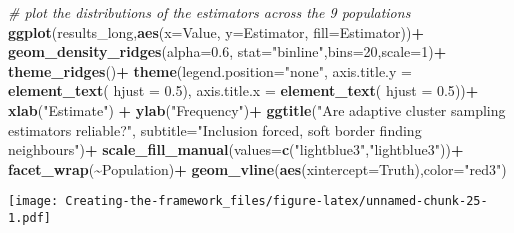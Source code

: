 \documentclass[
]{article}
\newenvironment{Shaded}{\begin{snugshade}}{\end{snugshade}}
\newcommand{\AttributeTok}[1]{\textcolor[rgb]{0.13,0.29,0.53}{#1}}
\newcommand{\CommentTok}[1]{\textcolor[rgb]{0.56,0.35,0.01}{\textit{#1}}}
\newcommand{\DecValTok}[1]{\textcolor[rgb]{0.00,0.00,0.81}{#1}}
\newcommand{\FloatTok}[1]{\textcolor[rgb]{0.00,0.00,0.81}{#1}}
\newcommand{\FunctionTok}[1]{\textcolor[rgb]{0.13,0.29,0.53}{\textbf{#1}}}
\newcommand{\NormalTok}[1]{#1}
\newcommand{\SpecialCharTok}[1]{\textcolor[rgb]{0.81,0.36,0.00}{\textbf{#1}}}
\newcommand{\StringTok}[1]{\textcolor[rgb]{0.31,0.60,0.02}{#1}}
\begin{document}
\begin{Shaded}
\begin{Highlighting}[]
\CommentTok{\# plot the distributions of the estimators across the 9 populations}
\FunctionTok{ggplot}\NormalTok{(results\_long,}\FunctionTok{aes}\NormalTok{(}\AttributeTok{x=}\NormalTok{Value, }\AttributeTok{y=}\NormalTok{Estimator, }\AttributeTok{fill=}\NormalTok{Estimator))}\SpecialCharTok{+}
  \FunctionTok{geom\_density\_ridges}\NormalTok{(}\AttributeTok{alpha=}\FloatTok{0.6}\NormalTok{, }\AttributeTok{stat=}\StringTok{"binline"}\NormalTok{,}\AttributeTok{bins=}\DecValTok{20}\NormalTok{,}\AttributeTok{scale=}\DecValTok{1}\NormalTok{)}\SpecialCharTok{+}
  \FunctionTok{theme\_ridges}\NormalTok{()}\SpecialCharTok{+}
  \FunctionTok{theme}\NormalTok{(}\AttributeTok{legend.position=}\StringTok{"none"}\NormalTok{,}
        \AttributeTok{axis.title.y =} \FunctionTok{element\_text}\NormalTok{( }\AttributeTok{hjust =} \FloatTok{0.5}\NormalTok{),}
        \AttributeTok{axis.title.x =} \FunctionTok{element\_text}\NormalTok{( }\AttributeTok{hjust =} \FloatTok{0.5}\NormalTok{))}\SpecialCharTok{+}
  \FunctionTok{xlab}\NormalTok{(}\StringTok{"Estimate"}\NormalTok{) }\SpecialCharTok{+}
  \FunctionTok{ylab}\NormalTok{(}\StringTok{"Frequency"}\NormalTok{)}\SpecialCharTok{+}
  \FunctionTok{ggtitle}\NormalTok{(}\StringTok{"Are adaptive cluster sampling estimators reliable?"}\NormalTok{,}
          \AttributeTok{subtitle=}\StringTok{"Inclusion forced, soft border finding neighbours"}\NormalTok{)}\SpecialCharTok{+}
  \FunctionTok{scale\_fill\_manual}\NormalTok{(}\AttributeTok{values=}\FunctionTok{c}\NormalTok{(}\StringTok{"lightblue3"}\NormalTok{,}\StringTok{"lightblue3"}\NormalTok{))}\SpecialCharTok{+}
  \FunctionTok{facet\_wrap}\NormalTok{(}\SpecialCharTok{\textasciitilde{}}\NormalTok{Population)}\SpecialCharTok{+}
  \FunctionTok{geom\_vline}\NormalTok{(}\FunctionTok{aes}\NormalTok{(}\AttributeTok{xintercept=}\NormalTok{Truth),}\AttributeTok{color=}\StringTok{"red3"}\NormalTok{)}
\end{Highlighting}
\end{Shaded}

\texttt{[image: Creating-the-framework\_files/figure-latex/unnamed-chunk-25-1.pdf]}
\end{document}
